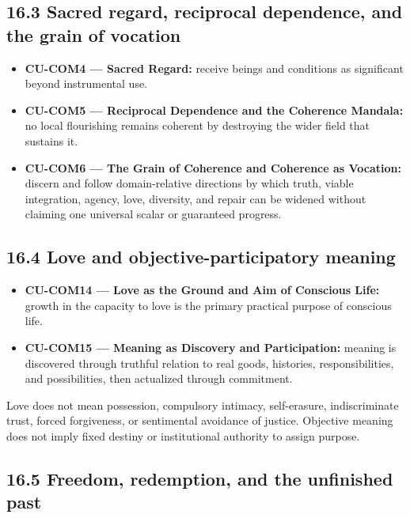 \documentclass[
  11pt,
]{article}
\providecommand{\tightlist}{%
  \setlength{\itemsep}{0pt}\setlength{\parskip}{0pt}}
\begin{document}
\subsection{16.3 Sacred regard, reciprocal dependence, and the grain of
vocation}\label{sacred-regard-reciprocal-dependence-and-the-grain-of-vocation}

\begin{itemize}
\tightlist
\item
  \textbf{CU-COM4 --- Sacred Regard:} receive beings and conditions as
  significant beyond instrumental use.
\item
  \textbf{CU-COM5 --- Reciprocal Dependence and the Coherence Mandala:}
  no local flourishing remains coherent by destroying the wider field
  that sustains it.
\item
  \textbf{CU-COM6 --- The Grain of Coherence and Coherence as Vocation:}
  discern and follow domain-relative directions by which truth, viable
  integration, agency, love, diversity, and repair can be widened
  without claiming one universal scalar or guaranteed progress.
\end{itemize}

\subsection{16.4 Love and objective-participatory
meaning}\label{love-and-objective-participatory-meaning}

\begin{itemize}
\tightlist
\item
  \textbf{CU-COM14 --- Love as the Ground and Aim of Conscious Life:}
  growth in the capacity to love is the primary practical purpose of
  conscious life.
\item
  \textbf{CU-COM15 --- Meaning as Discovery and Participation:} meaning
  is discovered through truthful relation to real goods, histories,
  responsibilities, and possibilities, then actualized through
  commitment.
\end{itemize}

Love does not mean possession, compulsory intimacy, self-erasure,
indiscriminate trust, forced forgiveness, or sentimental avoidance of
justice. Objective meaning does not imply fixed destiny or institutional
authority to assign purpose.

\subsection{16.5 Freedom, redemption, and the unfinished
past}\label{freedom-redemption-and-the-unfinished-past}
\end{document}
